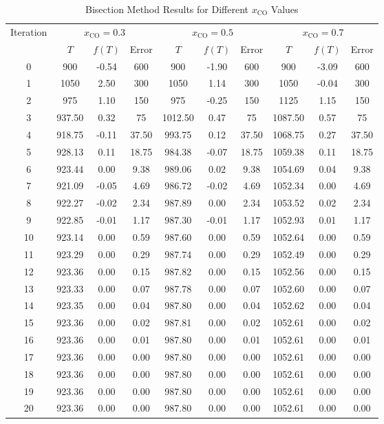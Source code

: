 \documentclass[10pt]{article}
\begin{document}
\begin{table}[H]
\centering
\caption{Bisection Method Results for Different \( x_{\text{CO}} \) Values}
\begin{tabular}{cccccccccc}
\toprule
Iteration & \multicolumn{3}{c}{\( x_{\text{CO}} = 0.3 \)} & \multicolumn{3}{c}{\( x_{\text{CO}} = 0.5 \)} & \multicolumn{3}{c}{\( x_{\text{CO}} = 0.7 \)} \\
\cmidrule(r){2-10}
 & \( T \) & \( f(T) \) & Error & \( T \) & \( f(T) \) & Error & \( T \) & \( f(T) \) & Error \\
\midrule
0 & 900 & -0.54 & 600 & 900 & -1.90 & 600 & 900 & -3.09 & 600 \\
1 & 1050 & 2.50 & 300 & 1050 & 1.14 & 300 & 1050 & -0.04 & 300 \\
2 & 975 & 1.10 & 150 & 975 & -0.25 & 150 & 1125 & 1.15 & 150 \\
3 & 937.50 & 0.32 & 75 & 1012.50 & 0.47 & 75 & 1087.50 & 0.57 & 75 \\
4 & 918.75 & -0.11 & 37.50 & 993.75 & 0.12 & 37.50 & 1068.75 & 0.27 & 37.50 \\
5 & 928.13 & 0.11 & 18.75 & 984.38 & -0.07 & 18.75 & 1059.38 & 0.11 & 18.75 \\
6 & 923.44 & 0.00 & 9.38 & 989.06 & 0.02 & 9.38 & 1054.69 & 0.04 & 9.38 \\
7 & 921.09 & -0.05 & 4.69 & 986.72 & -0.02 & 4.69 & 1052.34 & 0.00 & 4.69 \\
8 & 922.27 & -0.02 & 2.34 & 987.89 & 0.00 & 2.34 & 1053.52 & 0.02 & 2.34 \\
9 & 922.85 & -0.01 & 1.17 & 987.30 & -0.01 & 1.17 & 1052.93 & 0.01 & 1.17 \\
10 & 923.14 & 0.00 & 0.59 & 987.60 & 0.00 & 0.59 & 1052.64 & 0.00 & 0.59 \\
11 & 923.29 & 0.00 & 0.29 & 987.74 & 0.00 & 0.29 & 1052.49 & 0.00 & 0.29 \\
12 & 923.36 & 0.00 & 0.15 & 987.82 & 0.00 & 0.15 & 1052.56 & 0.00 & 0.15 \\
13 & 923.33 & 0.00 & 0.07 & 987.78 & 0.00 & 0.07 & 1052.60 & 0.00 & 0.07 \\
14 & 923.35 & 0.00 & 0.04 & 987.80 & 0.00 & 0.04 & 1052.62 & 0.00 & 0.04 \\
15 & 923.36 & 0.00 & 0.02 & 987.81 & 0.00 & 0.02 & 1052.61 & 0.00 & 0.02 \\
16 & 923.36 & 0.00 & 0.01 & 987.80 & 0.00 & 0.01 & 1052.61 & 0.00 & 0.01 \\
17 & 923.36 & 0.00 & 0.00 & 987.80 & 0.00 & 0.00 & 1052.61 & 0.00 & 0.00 \\
18 & 923.36 & 0.00 & 0.00 & 987.80 & 0.00 & 0.00 & 1052.61 & 0.00 & 0.00 \\
19 & 923.36 & 0.00 & 0.00 & 987.80 & 0.00 & 0.00 & 1052.61 & 0.00 & 0.00 \\
20 & 923.36 & 0.00 & 0.00 & 987.80 & 0.00 & 0.00 & 1052.61 & 0.00 & 0.00 \\
\bottomrule
\end{tabular}
\end{table}
\end{document}
